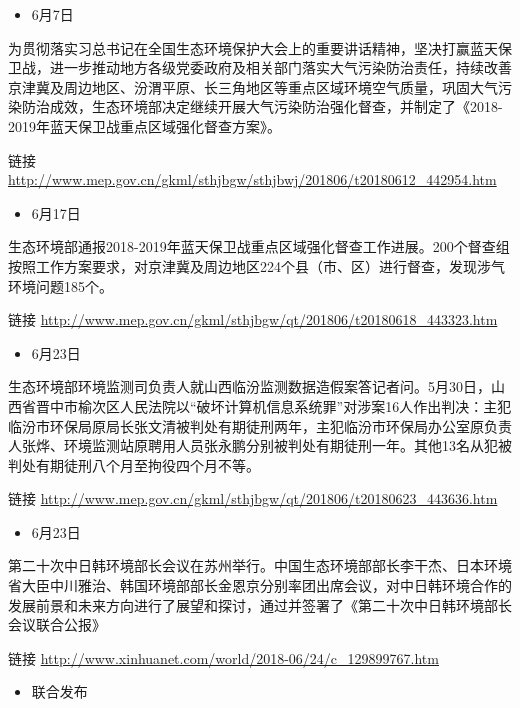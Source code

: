 \documentclass[
]{book}
\providecommand{\tightlist}{%
  \setlength{\itemsep}{0pt}\setlength{\parskip}{0pt}}
\begin{document}
\begin{itemize}
\tightlist
\item
  6月7日
\end{itemize}

为贯彻落实习总书记在全国生态环境保护大会上的重要讲话精神，坚决打赢蓝天保卫战，进一步推动地方各级党委政府及相关部门落实大气污染防治责任，持续改善京津冀及周边地区、汾渭平原、长三角地区等重点区域环境空气质量，巩固大气污染防治成效，生态环境部决定继续开展大气污染防治强化督查，并制定了《2018-2019年蓝天保卫战重点区域强化督查方案》。

链接 \url{http://www.mep.gov.cn/gkml/sthjbgw/sthjbwj/201806/t20180612_442954.htm}

\begin{itemize}
\tightlist
\item
  6月17日
\end{itemize}

生态环境部通报2018-2019年蓝天保卫战重点区域强化督查工作进展。200个督查组按照工作方案要求，对京津冀及周边地区224个县（市、区）进行督查，发现涉气环境问题185个。

链接 \url{http://www.mep.gov.cn/gkml/sthjbgw/qt/201806/t20180618_443323.htm}

\begin{itemize}
\tightlist
\item
  6月23日
\end{itemize}

生态环境部环境监测司负责人就山西临汾监测数据造假案答记者问。5月30日，山西省晋中市榆次区人民法院以``破坏计算机信息系统罪''对涉案16人作出判决：主犯临汾市环保局原局长张文清被判处有期徒刑两年，主犯临汾市环保局办公室原负责人张烨、环境监测站原聘用人员张永鹏分别被判处有期徒刑一年。其他13名从犯被判处有期徒刑八个月至拘役四个月不等。

链接 \url{http://www.mep.gov.cn/gkml/sthjbgw/qt/201806/t20180623_443636.htm}

\begin{itemize}
\tightlist
\item
  6月23日
\end{itemize}

第二十次中日韩环境部长会议在苏州举行。中国生态环境部部长李干杰、日本环境省大臣中川雅治、韩国环境部部长金恩京分别率团出席会议，对中日韩环境合作的发展前景和未来方向进行了展望和探讨，通过并签署了《第二十次中日韩环境部长会议联合公报》

链接 \url{http://www.xinhuanet.com/world/2018-06/24/c_129899767.htm}

\begin{itemize}
\tightlist
\item
  联合发布
\end{itemize}
\end{document}
